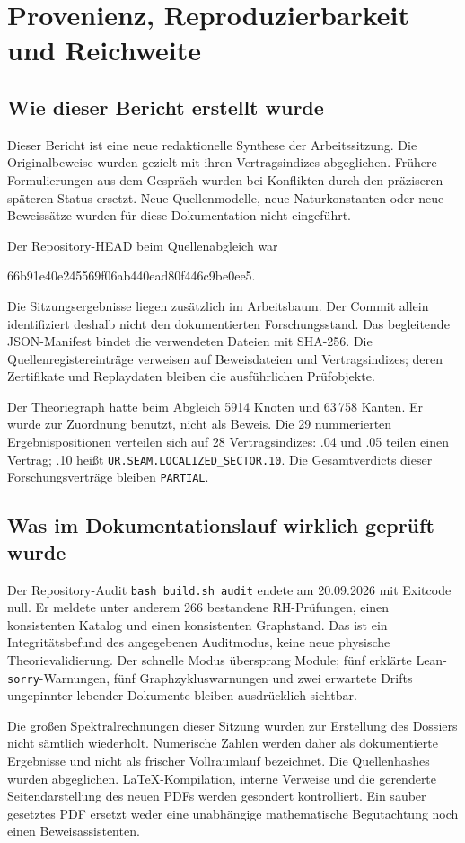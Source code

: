 \chapter{Provenienz, Reproduzierbarkeit und Reichweite}
\section{Wie dieser Bericht erstellt wurde}
Dieser Bericht ist eine neue redaktionelle Synthese der Arbeitssitzung. Die Originalbeweise wurden gezielt mit ihren Vertragsindizes abgeglichen. Frühere Formulierungen aus dem Gespräch wurden bei Konflikten durch den präziseren späteren Status ersetzt. Neue Quellenmodelle, neue Naturkonstanten oder neue Beweissätze wurden für diese Dokumentation nicht eingeführt.

Der Repository-HEAD beim Quellenabgleich war
\begin{center}\small\ttfamily 66b91e40e245569f06ab440ead80f446c9be0ee5.\end{center}
Die Sitzungsergebnisse liegen zusätzlich im Arbeitsbaum. Der Commit allein identifiziert deshalb nicht den dokumentierten Forschungsstand. Das begleitende JSON-Manifest bindet die verwendeten Dateien mit SHA-256. Die Quellenregistereinträge verweisen auf Beweisdateien und Vertragsindizes; deren Zertifikate und Replaydaten bleiben die ausführlichen Prüfobjekte.

Der Theoriegraph hatte beim Abgleich 5914 Knoten und 63\,758 Kanten. Er wurde zur Zuordnung benutzt, nicht als Beweis. Die 29 nummerierten Ergebnispositionen verteilen sich auf 28 Vertragsindizes: .04 und .05 teilen einen Vertrag; .10 heißt \texttt{UR.SEAM.LOCALIZED\_SECTOR.10}. Die Gesamtverdicts dieser Forschungsverträge bleiben \texttt{PARTIAL}.

\section{Was im Dokumentationslauf wirklich geprüft wurde}
Der Repository-Audit \texttt{bash build.sh audit} endete am 20.09.2026 mit Exitcode null. Er meldete unter anderem 266 bestandene RH-Prüfungen, einen konsistenten Katalog und einen konsistenten Graphstand. Das ist ein Integritätsbefund des angegebenen Auditmodus, keine neue physische Theorievalidierung. Der schnelle Modus übersprang Module; fünf erklärte Lean-\texttt{sorry}-Warnungen, fünf Graphzykluswarnungen und zwei erwartete Drifts ungepinnter lebender Dokumente bleiben ausdrücklich sichtbar.

Die großen Spektralrechnungen dieser Sitzung wurden zur Erstellung des Dossiers nicht sämtlich wiederholt. Numerische Zahlen werden daher als dokumentierte Ergebnisse und nicht als frischer Vollraumlauf bezeichnet. Die Quellenhashes wurden abgeglichen. LaTeX-Kompilation, interne Verweise und die gerenderte Seitendarstellung des neuen PDFs werden gesondert kontrolliert. Ein sauber gesetztes PDF ersetzt weder eine unabhängige mathematische Begutachtung noch einen Beweisassistenten.

